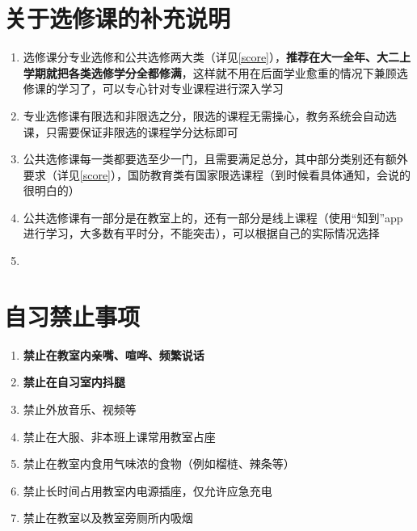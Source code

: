 \section[关于选修课的补充说明]{关于选修课的补充说明}
\begin{enumerate}
    \item 选修课分专业选修和公共选修两大类（详见\uline{\ref{score}}），\textbf{推荐在大一全年、大二上学期就把各类选修学分全都修满}，这样就不用在后面学业愈重的情况下兼顾选修课的学习了，可以专心针对专业课程进行深入学习
    \item 专业选修课有限选和非限选之分，限选的课程无需操心，教务系统会自动选课，只需要保证非限选的课程学分达标即可
    \item 公共选修课每一类都要选至少一门，且需要满足总分，其中部分类别还有额外要求（详见\uline{\ref{score}}），国防教育类有国家限选课程（到时候看具体通知，会说的很明白的）
    \item 公共选修课有一部分是在教室上的，还有一部分是线上课程（使用“知到”app进行学习，大多数有平时分，不能突击），可以根据自己的实际情况选择\footnotemark
    \item \textbf{}
\end{enumerate}

\section[自习禁止事项]{自习禁止事项}
\begin{enumerate}
    \item \textbf{禁止在教室内亲嘴、喧哗、频繁说话}
    \item \textbf{禁止在自习室内抖腿}
    \item 禁止外放音乐、视频等
    \item 禁止在大服、非本班上课常用教室占座
    \item 禁止在教室内食用气味浓的食物（例如榴梿、辣条等）
    \item 禁止长时间占用教室内电源插座，仅允许应急充电
    \item 禁止在教室以及教室旁厕所内吸烟
\end{enumerate}

